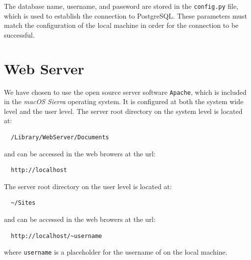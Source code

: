 \documentclass[a4paper, 12pt]{report}
\begin{document}
The database name, username, and password are stored in the \texttt{config.py} file, which is used to establish the connection to PostgreSQL. These parameters must match the configuration of the local machine in order for the connection to be successful.

\section{Web Server}
We have chosen to use the open source server software \texttt{Apache}, which is included in the \textit{macOS Sierra} operating system. It is configured at both the system wide level and the user level. The server root directory on the system level is located at:

\begin{verbatim}
  /Library/WebServer/Documents
\end{verbatim}

and can be accessed in the web browers at the url:

\begin{verbatim}
  http://localhost
\end{verbatim}

The server root directory on the user level is located at:

\begin{verbatim}
  ~/Sites
\end{verbatim}

and can be accessed in the web browers at the url:

\begin{verbatim}
  http://localhost/~username
\end{verbatim}

where \texttt{username} is a placeholder for the username of on the local machine.
\end{document}
